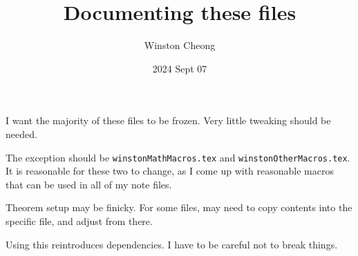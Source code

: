 \documentclass{scrartcl}
\title{Documenting these files}
\author{Winston Cheong}
\date{2024 Sept 07}
\begin{document}
\maketitle

I want the majority of these files to be frozen.
Very little tweaking should be needed.

The exception should be \texttt{winstonMathMacros.tex} and
\texttt{winstonOtherMacros.tex}.
It is reasonable for these two to change, as I come up with reasonable macros that can be used in all of my note files.

Theorem setup may be finicky. For some files, may need to copy contents into the
specific file, and adjust from there.



Using this reintroduces dependencies. I have to be careful not to break things.
\end{document}
